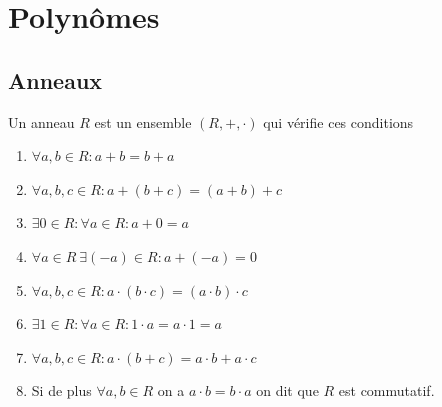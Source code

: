 \chapter{Polynômes}
\section{Anneaux}
\begin{definition}[Anneau]
Un  anneau $R$ est un ensemble $(R,+,\cdot)$ qui vérifie ces conditions
\begin{enumerate}
\item $\forall a,b\in R:a+b=b+a$
\item $\forall a,b,c\in R:a+(b+c)=(a+b)+c$
\item $\exists0\in R:\forall a\in R:a+0=a$
\item $\forall a\in R~\exists(-a)\in R:a+(-a)=0$
\item $\forall a,b,c\in R:a\cdot(b\cdot c)=(a\cdot b)\cdot c$
\item $\exists 1 \in R:\forall a\in R:1\cdot a=a\cdot1=a$
\item $\forall a,b,c\in R:a\cdot(b+c)=a\cdot b+a\cdot c$
\item Si de plus $\forall a,b\in R$ on a $a\cdot b=b\cdot a$ on dit que $R$ est commutatif.
\end{enumerate}
\end{definition}

